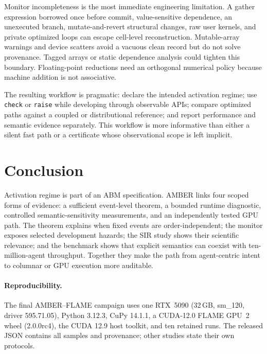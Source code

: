 \documentclass[sigconf,nonacm,review,natbib=true]{acmart}
\theoremstyle{definition}
\theoremstyle{plain}
\theoremstyle{remark}
\begin{document}
Monitor incompleteness is the most immediate engineering limitation. A
gather expression borrowed once before commit, value-sensitive dependence, an
unexecuted branch, mutate-and-revert structural changes, raw user kernels, and
private optimized loops can escape cell-level reconstruction. Mutable-array
warnings and device scatters avoid a vacuous clean record but do not solve
provenance. Tagged arrays or static dependence analysis could tighten
this boundary. Floating-point reductions need an orthogonal numerical policy
because machine addition is not associative.

The resulting workflow is pragmatic: declare the intended activation regime;
use \texttt{check} or \texttt{raise} while developing through observable APIs;
compare optimized paths against a coupled or distributional reference; and
report performance and semantic evidence separately. This workflow is more
informative than either a silent fast path or a certificate whose observational
scope is left implicit.

\section{Conclusion}

Activation regime is part of an ABM specification. AMBER links four scoped
forms of evidence: a sufficient event-level theorem, a bounded runtime
diagnostic, controlled semantic-sensitivity measurements, and an independently
tested GPU path. The theorem explains when fixed events are order-independent;
the monitor exposes selected development hazards; the SIR study shows their
scientific relevance; and the benchmark shows that explicit semantics can
coexist with ten-million-agent throughput. Together they make the path from
agent-centric intent to columnar or GPU execution more auditable.

\paragraph{Reproducibility.} The final AMBER--FLAME campaign uses one RTX~5090
(32\,GB, sm\_120, driver 595.71.05), Python 3.12.3, CuPy 14.1.1, a
CUDA-12.0 FLAME GPU~2 wheel (2.0.0rc4), the CUDA 12.9 host toolkit, and ten
retained runs. The released JSON contains all samples and provenance; other
studies state their own protocols.






\end{document}
